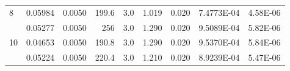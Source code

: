 \documentclass[a4paper,11pt]{article}
\begin{document}
\begin{table}[htpb]
\begin{tabular}{lrrrrrrrr}
				\multicolumn{1}{l|}{\cellcolor[HTML]{BBDAFF}8}  & \multicolumn{1}{r|}{\cellcolor[HTML]{EFEFEF}0.05984}              & \multicolumn{1}{r|}{\cellcolor[HTML]{EFEFEF}0.0050} & \multicolumn{1}{r|}{\cellcolor[HTML]{EFEFEF}199.6}                        & \multicolumn{1}{r|}{\cellcolor[HTML]{EFEFEF}3.0}       & \multicolumn{1}{r|}{\cellcolor[HTML]{EFEFEF}1.019}               & \multicolumn{1}{r|}{\cellcolor[HTML]{EFEFEF}0.020}     & \multicolumn{1}{r|}{\cellcolor[HTML]{EFEFEF}7.4773E-04}                  & \multicolumn{1}{r|}{\cellcolor[HTML]{EFEFEF}4.58E-06}  \\ \cline{2-9} 
				\rowcolor[HTML]{C0C0C0} 
				\multicolumn{1}{l|}{\cellcolor[HTML]{BBDAFF}9}  & \multicolumn{1}{r|}{\cellcolor[HTML]{C0C0C0}0.05277}              & \multicolumn{1}{r|}{\cellcolor[HTML]{C0C0C0}0.0050} & \multicolumn{1}{r|}{\cellcolor[HTML]{C0C0C0}256}                          & \multicolumn{1}{r|}{\cellcolor[HTML]{C0C0C0}3.0}       & \multicolumn{1}{r|}{\cellcolor[HTML]{C0C0C0}1.290}               & \multicolumn{1}{r|}{\cellcolor[HTML]{C0C0C0}0.020}     & \multicolumn{1}{r|}{\cellcolor[HTML]{C0C0C0}9.5089E-04}                  & \multicolumn{1}{r|}{\cellcolor[HTML]{C0C0C0}5.82E-06}  \\ \cline{2-9} 
				\multicolumn{1}{l|}{\cellcolor[HTML]{BBDAFF}10} & \multicolumn{1}{r|}{\cellcolor[HTML]{EFEFEF}0.04653}              & \multicolumn{1}{r|}{\cellcolor[HTML]{EFEFEF}0.0050} & \multicolumn{1}{r|}{\cellcolor[HTML]{EFEFEF}190.8}                        & \multicolumn{1}{r|}{\cellcolor[HTML]{EFEFEF}3.0}       & \multicolumn{1}{r|}{\cellcolor[HTML]{EFEFEF}1.290}               & \multicolumn{1}{r|}{\cellcolor[HTML]{EFEFEF}0.020}     & \multicolumn{1}{r|}{\cellcolor[HTML]{EFEFEF}9.5370E-04}                  & \multicolumn{1}{r|}{\cellcolor[HTML]{EFEFEF}5.84E-06}  \\ \cline{2-9} 
				\rowcolor[HTML]{C0C0C0} 
				\multicolumn{1}{l|}{\cellcolor[HTML]{BBDAFF}11} & \multicolumn{1}{r|}{\cellcolor[HTML]{C0C0C0}0.05224}              & \multicolumn{1}{r|}{\cellcolor[HTML]{C0C0C0}0.0050} & \multicolumn{1}{r|}{\cellcolor[HTML]{C0C0C0}220.4}                        & \multicolumn{1}{r|}{\cellcolor[HTML]{C0C0C0}3.0}       & \multicolumn{1}{r|}{\cellcolor[HTML]{C0C0C0}1.210}               & \multicolumn{1}{r|}{\cellcolor[HTML]{C0C0C0}0.020}     & \multicolumn{1}{r|}{\cellcolor[HTML]{C0C0C0}8.9239E-04}                  & \multicolumn{1}{r|}{\cellcolor[HTML]{C0C0C0}5.47E-06}  \\ \cline{2-9} 
				
			\end{tabular}
		\end{table}
		
\end{document}
